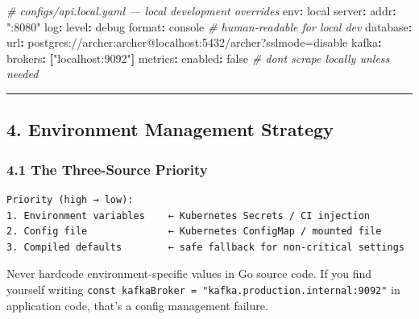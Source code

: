 \documentclass[
]{article}
\newenvironment{Shaded}{}{}
\newcommand{\AttributeTok}[1]{\textcolor[rgb]{0.49,0.56,0.16}{#1}}
\newcommand{\CharTok}[1]{\textcolor[rgb]{0.25,0.44,0.63}{#1}}
\newcommand{\CommentTok}[1]{\textcolor[rgb]{0.38,0.63,0.69}{\textit{#1}}}
\newcommand{\FunctionTok}[1]{\textcolor[rgb]{0.02,0.16,0.49}{#1}}
\newcommand{\KeywordTok}[1]{\textcolor[rgb]{0.00,0.44,0.13}{\textbf{#1}}}
\newcommand{\StringTok}[1]{\textcolor[rgb]{0.25,0.44,0.63}{#1}}
\begin{document}
\begin{Shaded}
\begin{Highlighting}[]
\CommentTok{\# configs/api.local.yaml — local development overrides}
\FunctionTok{env}\KeywordTok{:}\AttributeTok{ local}
\FunctionTok{server}\KeywordTok{:}
\AttributeTok{  }\FunctionTok{addr}\KeywordTok{:}\AttributeTok{ }\StringTok{":8080"}
\FunctionTok{log}\KeywordTok{:}
\AttributeTok{  }\FunctionTok{level}\KeywordTok{:}\AttributeTok{ debug}
\AttributeTok{  }\FunctionTok{format}\KeywordTok{:}\AttributeTok{ console}\CommentTok{   \# human{-}readable for local dev}
\FunctionTok{database}\KeywordTok{:}
\AttributeTok{  }\FunctionTok{url}\KeywordTok{:}\AttributeTok{ postgres://archer:archer@localhost:5432/archer?sslmode=disable}
\FunctionTok{kafka}\KeywordTok{:}
\AttributeTok{  }\FunctionTok{brokers}\KeywordTok{:}\AttributeTok{ }\KeywordTok{[}\StringTok{"localhost:9092"}\KeywordTok{]}
\FunctionTok{metrics}\KeywordTok{:}
\AttributeTok{  }\FunctionTok{enabled}\KeywordTok{:}\AttributeTok{ }\CharTok{false}\CommentTok{  \# don\textquotesingle{}t scrape locally unless needed}
\end{Highlighting}
\end{Shaded}

\begin{center}\rule{0.5\linewidth}{0.5pt}\end{center}

\hypertarget{environment-management-strategy}{%
\subsection{4. Environment Management
Strategy}\label{environment-management-strategy}}

\hypertarget{the-three-source-priority}{%
\subsubsection{4.1 The Three-Source
Priority}\label{the-three-source-priority}}

\begin{verbatim}
Priority (high → low):
1. Environment variables    ← Kubernetes Secrets / CI injection
2. Config file              ← Kubernetes ConfigMap / mounted file
3. Compiled defaults        ← safe fallback for non-critical settings
\end{verbatim}

Never hardcode environment-specific values in Go source code. If you
find yourself writing
\texttt{const\ kafkaBroker\ =\ "kafka.production.internal:9092"} in
application code, that's a config management failure.
\end{document}
